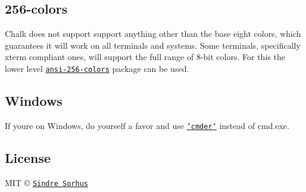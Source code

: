 \subsection*{256-\/colors}

Chalk does not support support anything other than the base eight colors, which guarantees it will work on all terminals and systems. Some terminals, specifically {\ttfamily xterm} compliant ones, will support the full range of 8-\/bit colors. For this the lower level \href{https://github.com/jbnicolai/ansi-256-colors}{\tt ansi-\/256-\/colors} package can be used.

\subsection*{Windows}

If you\textquotesingle{}re on Windows, do yourself a favor and use \href{http://bliker.github.io/cmder/}{\tt `cmder`} instead of {\ttfamily cmd.\+exe}.

\subsection*{License}

M\+I\+T © \href{http://sindresorhus.com}{\tt Sindre Sorhus} 